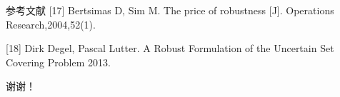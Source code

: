 \documentclass[10pt]{beamer}
\begin{document}
\begin{frame}[allowframebreaks]{参考文献}
[17] Bertsimas D, Sim M. The price of robustness [J]. Operations Research,2004,52(1).

[18] Dirk Degel, Pascal Lutter. A Robust Formulation of the Uncertain Set Covering Problem 2013.













\end{frame}

\begin{frame}

\begin{center}

  \Huge{谢谢！}
\end{center}

\end{frame}
\end{document}
